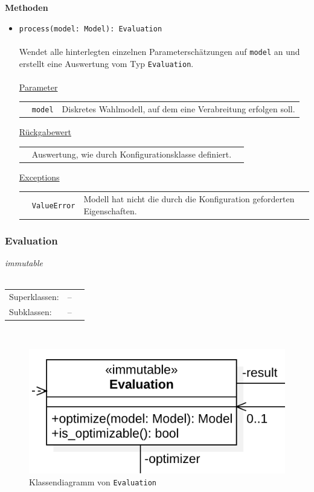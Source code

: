 \documentclass{article}
\begin{document}
\textbf{Methoden}
\begin{itemize}\setlength\itemsep{3em}
\item \texttt{process(model: Model): Evaluation}\\\\
Wendet alle hinterlegten einzelnen Parameterschätzungen auf \texttt{model} an und erstellt eine Auswertung vom Typ \texttt{Evaluation}.
\\\\
\underline{Parameter}\\
\begin{tabular}{lll}
 & \texttt{model} & Diskretes Wahlmodell, auf dem eine Verabreitung erfolgen soll.\\
\end{tabular}

\underline{Rückgabewert}\\
\begin{tabular}{lll}
 & Auswertung, wie durch Konfigurationsklasse definiert.\\
\end{tabular}

\underline{Exceptions}\\
\begin{tabular}{lll}
 & \texttt{ValueError} & Modell hat nicht die durch die Konfiguration geforderten Eigenschaften.\\
\end{tabular}
\end{itemize}

\newpage
\subsubsection*{\large{\textbf{Evaluation}\label{cls:Evaluation}}}
\textit{\flqq{}immutable\frqq}\normalsize\\\\
\begin{tabular}{lll}
 Superklassen: & --\\
 Subklassen: & --
\end{tabular}\\
\begin{figure}[H]%
    \centering
    \includegraphics[width=13cm]{entwurf/Entwurf_dokument/img/cls/model/Evaluation.png}
    \caption{Klassendiagramm von \texttt{Evaluation}}
\end{figure}
\end{document}
